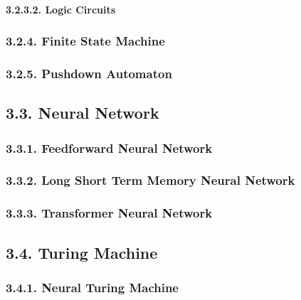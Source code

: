 \documentclass[
]{article}
\begin{document}
\hypertarget{logic-circuits}{%
\paragraph{3.2.3.2. Logic Circuits}\label{logic-circuits}}

\hypertarget{finite-state-machine}{%
\subsubsection{3.2.4. Finite State Machine}\label{finite-state-machine}}

\hypertarget{pushdown-automaton}{%
\subsubsection{3.2.5. Pushdown Automaton}\label{pushdown-automaton}}

\hypertarget{neural-network}{%
\subsection{3.3. Neural Network}\label{neural-network}}

\hypertarget{feedforward-neural-network}{%
\subsubsection{3.3.1. Feedforward Neural
Network}\label{feedforward-neural-network}}

\hypertarget{long-short-term-memory-neural-network}{%
\subsubsection{3.3.2. Long Short Term Memory Neural
Network}\label{long-short-term-memory-neural-network}}

\hypertarget{transformer-neural-network}{%
\subsubsection{3.3.3. Transformer Neural
Network}\label{transformer-neural-network}}

\hypertarget{turing-machine}{%
\subsection{3.4. Turing Machine}\label{turing-machine}}

\hypertarget{neural-turing-machine}{%
\subsubsection{3.4.1. Neural Turing
Machine}\label{neural-turing-machine}}
\end{document}
